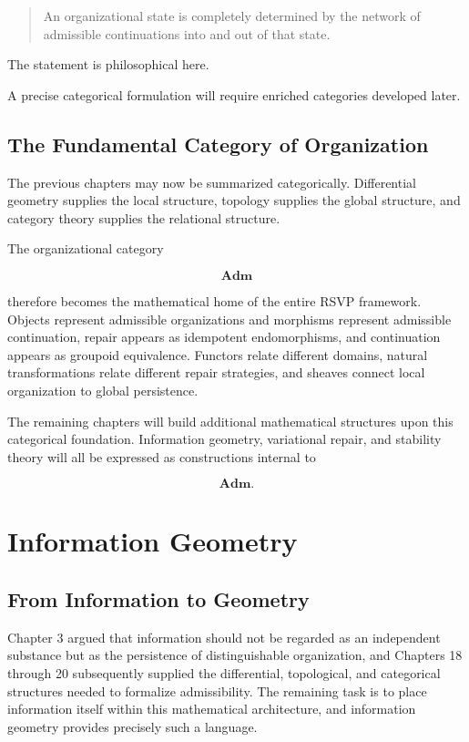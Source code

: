 \documentclass[11pt,oneside]{book}
\numberwithin{equation}{chapter}
\theoremstyle{definition}
\theoremstyle{plain}
\begin{document}
\begin{quote}

An organizational state is completely determined by the network of
admissible continuations into and out of that state.

\end{quote}

The statement is philosophical here.

A precise categorical formulation will require enriched categories developed
later.

\section{The Fundamental Category of Organization}

The previous chapters may now be summarized categorically. Differential geometry supplies the local structure, topology supplies the global structure, and category theory supplies the relational structure.

The organizational category

\[
\mathbf{Adm}
\]

therefore becomes the mathematical home of the entire RSVP framework. Objects represent admissible organizations and morphisms represent admissible continuation, repair appears as idempotent endomorphisms, and continuation appears as groupoid equivalence. Functors relate different domains, natural transformations relate different repair strategies, and sheaves connect local organization to global persistence.

The remaining chapters will build additional mathematical structures upon
this categorical foundation. Information geometry, variational repair, and
stability theory will all be expressed as constructions internal to

\[
\mathbf{Adm}.
\]

\chapter{Information Geometry}

\section{From Information to Geometry}

Chapter 3 argued that information should not be regarded as an independent substance but as the persistence of distinguishable organization, and Chapters 18 through 20 subsequently supplied the differential, topological, and categorical structures needed to formalize admissibility. The remaining task is to place information itself within this mathematical architecture, and information geometry provides precisely such a language.
\end{document}
